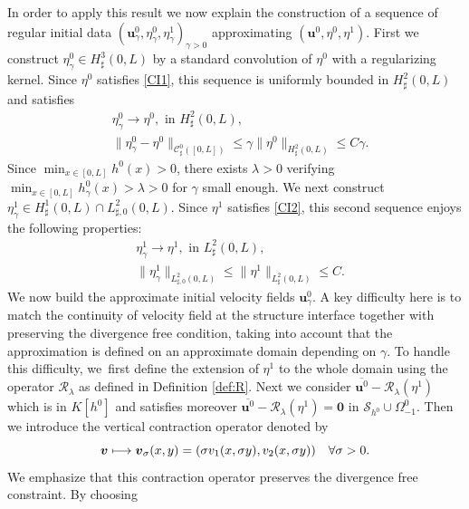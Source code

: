 \documentclass[10pt]{amsart}
\let\mathcal\mathscr
\newcommand\mto{\mathchoice{\longmapsto}{\mapsto}{\mapsto}{\mapsto}}
\theoremstyle{remark}
\theoremstyle{definition}
\newcommand{\ug}{\boldsymbol{u}}
\newcommand{\vg}{\boldsymbol{v}}
\newcommand{\BS}[1]{\boldsymbol{#1}}
\begin{document}
In order to apply this result we now explain the construction of a sequence of regular initial data $(\ug_\gamma^0,\eta_\gamma^0, \eta_\gamma^1)_{\gamma >0}$ approximating $(\ug^0, \eta^0, \eta^1)$. First we construct \hbox{$\eta^0_\gamma\in H^{3}_{\sharp}(0,L)$} by a standard convolution of $\eta^0$ with a regularizing kernel. Since $\eta^0$ satisfies \eqref{CI1}, this sequence is uniformly bounded in $H^2_\sharp(0,L)$ and satisfies
\begin{align*}
& \eta^0_\gamma\to \eta^0, \text{ in }H^2_\sharp(0,L),\\
& \| \eta^0_\gamma- \eta^0\|_{\mathcal{C}_\sharp^0([0, L])}\leq \gamma \|\eta^0\|_{H^2_\sharp(0, L)}\leq C\gamma.
\end{align*}
Since $\min_{x\in[0, L]}h^0(x)>0$, there exists $\lambda>0$ verifying $\min_{x\in[0, L]}h_\gamma^0(x)>\lambda >0$ for $\gamma$ small enough.
We next construct $\eta^1_\gamma \in H^{1}_{\sharp}(0,L)\cap L^2_{\sharp, 0}(0, L)$.
Since $\eta^1$ satisfies \eqref{CI2}, this second sequence enjoys the following properties:
\begin{align*}
& \eta^1_\gamma\to \eta^1, \text{ in }L^2_\sharp(0,L),\\
& \| \eta^1_\gamma \|_{{L}^2_{\sharp,0}(0, L)}\leq \|\eta^1\|_{L^2_\sharp(0, L)}\leq C.
\end{align*}
We now build the approximate initial velocity fields $\ug^0_{\gamma}$.
A key difficulty here is to match the continuity of velocity field at the structure interface together with preserving the divergence free condition, taking into account
that the approximation is defined on an approximate domain depending on $\gamma$.
To handle this difficulty, we~first define the extension of $\eta^1$ to the whole domain using the operator $\mathcal R_{\lambda}$
as defined in Definition \ref{def:R}. Next we consider $\overline{\ug^0}-\mathcal{R}_\lambda(\eta^1)$ which is in $K[h^0]$ and satisfies moreover $\overline{\ug^{0}}-\mathcal{R}_\lambda(\eta^1)= \BS{0}$ in $\mathcal{S}_{h^0}\cup \Omega_{-1}^0$. Then we introduce the vertical contraction operator denoted by
\[
\vg \mto \vg_\sigma(x, y)=(\sigma v_1(x, \sigma y), v_2(x, \sigma y)) \quad \forall \sigma >0.
\]
We emphasize that this contraction operator preserves the divergence free constraint. By choosing
\end{document}
